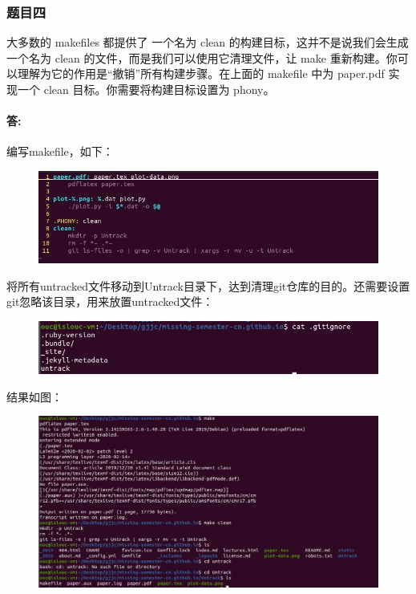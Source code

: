 \documentclass[a4paper, 12pt]{article}
\begin{document}
	\subsubsection{题目四}
	大多数的 makefiles 都提供了 一个名为 clean 的构建目标，这并不是说我们会生成一个名为 clean 的文件，而是我们可以使用它清理文件，让 make 重新构建。你可以理解为它的作用是“撤销”所有构建步骤。在上面的 makefile 中为 paper.pdf 实现一个 clean 目标。你需要将构建目标设置为 phony。
	
	\paragraph{答:}
	编写makefile，如下：
	
	\begin{figure}[H]
		\centering
		\includegraphics[width=1\textwidth]{012.jpg}
	\end{figure}
	
	将所有untracked文件移动到Untrack目录下，达到清理git仓库的目的。还需要设置git忽略该目录，用来放置untracked文件：
	
	\begin{figure}[H]
		\centering
		\includegraphics[width=1\textwidth]{013.jpg}
	\end{figure}
	
	结果如图：
	
	\begin{figure}[H]
		\centering
		\includegraphics[width=1\textwidth]{014.jpg}
	\end{figure}
	
\end{document}
